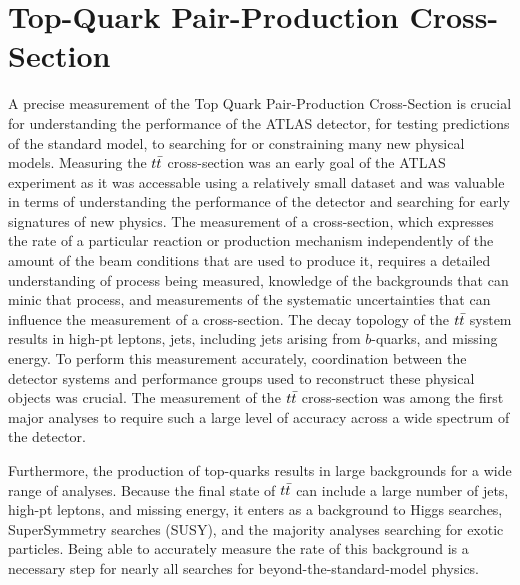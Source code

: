 %
%
%

\chapter{Top-Quark Pair-Production Cross-Section}

A precise measurement of the Top Quark Pair-Production Cross-Section is crucial for understanding the performance of the ATLAS detector, for testing predictions of the standard model, to searching for or constraining many new physical models.
Measuring the $t\bar{t}$ cross-section was an early goal of the ATLAS experiment as it was accessable using a relatively small dataset and was valuable in terms of understanding the performance of the detector and searching for early signatures of new physics.
The measurement of a cross-section, which expresses the rate of a particular reaction or production mechanism independently of the amount of the beam conditions that are used to produce it,
requires a detailed understanding of process being measured, knowledge of the backgrounds that can minic that process, and measurements of the systematic uncertainties that can influence the measurement of a cross-section.
The decay topology of the $t\bar{t}$ system results in high-pt leptons, jets, including jets arising from $b$-quarks, and missing energy.
To perform this measurement accurately, coordination between the detector systems and performance groups used to reconstruct these physical objects was crucial.
The measurement of the $t\bar{t}$ cross-section was among the first major analyses to require such a large level of accuracy across a wide spectrum of the detector. %

Furthermore, the production of top-quarks results in large backgrounds for a wide range of analyses.
Because the final state of $t\bar{t}$ can include a large number of jets, high-pt leptons, and missing energy, it enters as a background to Higgs searches, SuperSymmetry searches (SUSY),
and the majority analyses searching for exotic particles.
Being able to accurately measure the rate of this background is a necessary step for nearly all searches for beyond-the-standard-model physics.


